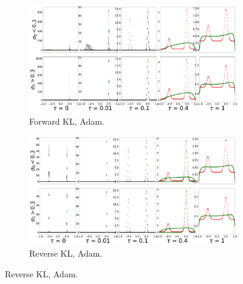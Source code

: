 \documentclass{article}
\begin{document}
\begin{figure}[!ht]
  \centering
  \begin{subfigure}[b]{0.4\linewidth}
    \centering
    \includegraphics[width=1\columnwidth]{figs/bandit/notlearnQ/modes=1/adam/pdf_forward_optim=adam_modes=1_lr=0.01.png}
    \caption{Forward KL, Adam.}
    \label{fig:bandit-pdf-forward-adam}
  \end{subfigure}%
  \begin{subfigure}[b]{0.4\linewidth}
    \centering
    \includegraphics[width=1\columnwidth]{figs/bandit/notlearnQ/modes=1/adam/pdf_reverse_optim=adam_modes=1_lr=0.01.png}
    \caption{Reverse KL, Adam. }
    \label{fig:bandit-pdf-reverse-adam}
  \end{subfigure}
  

\end{figure}
\end{document}
